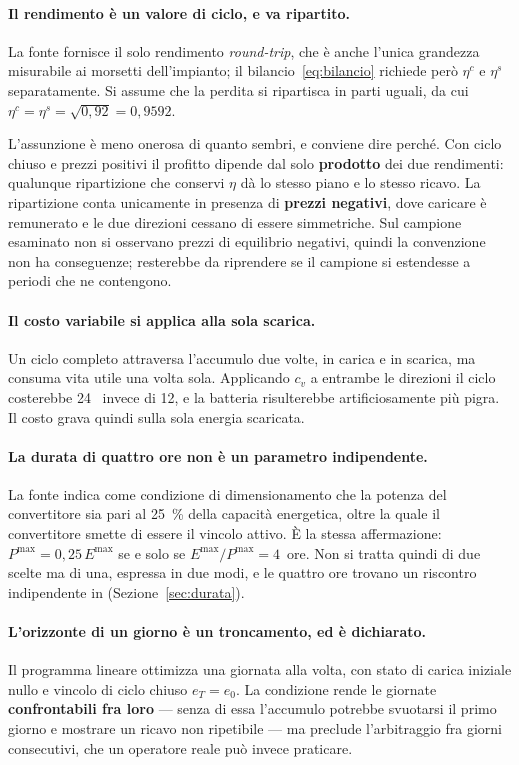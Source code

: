 \paragraph{Il rendimento \`e un valore di ciclo, e va ripartito.} La fonte fornisce il solo
rendimento \emph{round-trip}, che \`e anche l'unica grandezza misurabile ai morsetti
dell'impianto; il bilancio~\eqref{eq:bilancio} richiede per\`o $\eta^{c}$ e $\eta^{s}$
separatamente. Si assume che la perdita si ripartisca in parti uguali, da cui
$\eta^{c} = \eta^{s} = \sqrt{0{,}92} = 0{,}9592$.

L'assunzione \`e meno onerosa di quanto sembri, e conviene dire perch\'e. Con ciclo chiuso e
prezzi positivi il profitto dipende dal solo \textbf{prodotto} dei due rendimenti: qualunque
ripartizione che conservi $\eta$ d\`a lo stesso piano e lo stesso ricavo. La ripartizione
conta unicamente in presenza di \textbf{prezzi negativi}, dove caricare \`e remunerato e le
due direzioni cessano di essere simmetriche. Sul campione esaminato non si osservano prezzi
di equilibrio negativi, quindi la convenzione non ha conseguenze; resterebbe da riprendere se
il campione si estendesse a periodi che ne contengono.

\paragraph{Il costo variabile si applica alla sola scarica.} Un ciclo completo attraversa
l'accumulo due volte, in carica e in scarica, ma consuma vita utile una volta sola.
Applicando $c_v$ a entrambe le direzioni il ciclo costerebbe 24~\euromwh{} invece di 12, e la
batteria risulterebbe artificiosamente pi\`u pigra. Il costo grava quindi sulla sola energia
scaricata.

\paragraph{La durata di quattro ore non \`e un parametro indipendente.} La fonte indica come
condizione di dimensionamento che la potenza del convertitore sia pari al \SI{25}{\percent}
della capacit\`a energetica, oltre la quale il convertitore smette di essere il vincolo
attivo. \`E la stessa affermazione: $P^{\max} = 0{,}25\,E^{\max}$ se e solo se
$E^{\max}/P^{\max} = 4$~ore. Non si tratta quindi di due scelte ma di una, espressa in due
modi, e le quattro ore trovano un riscontro indipendente in
\textcite{mcconnell2015storage} (Sezione~\ref{sec:durata}).

\paragraph{L'orizzonte di un giorno \`e un troncamento, ed \`e dichiarato.} Il programma
lineare ottimizza una giornata alla volta, con stato di carica iniziale nullo e vincolo di
ciclo chiuso $e_T = e_0$. La condizione rende le giornate \textbf{confrontabili fra loro} ---
senza di essa l'accumulo potrebbe svuotarsi il primo giorno e mostrare un ricavo non
ripetibile --- ma preclude l'arbitraggio fra giorni consecutivi, che un operatore reale pu\`o
invece praticare.

